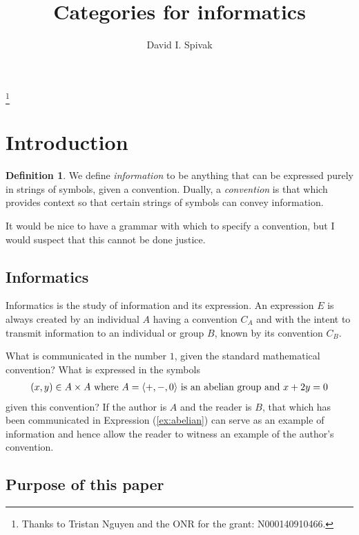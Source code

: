 \documentclass{amsart}
\def\tn{\textnormal}
\def\cross{\times}
\def\la{\langle}
\def\ra{\rangle}
\theoremstyle{remark}
\theoremstyle{definition}
\newtheorem{definition}[theorem]{Definition}
\begin{document}
\title{Categories for informatics}

\author{David I. Spivak}

\thanks{Thanks to Tristan Nguyen and the ONR for the grant: N000140910466.}

\maketitle

\tableofcontents

\section{Introduction}

\begin{definition} We define {\em information} to be anything that can be expressed purely in strings of symbols, given a convention.  Dually, a {\em convention} is that which provides context so that certain strings of symbols can convey information.  

\end{definition}

It would be nice to have a grammar with which to specify a convention, but I would suspect that this cannot be done justice.

\subsection{Informatics}

Informatics is the study of information and its expression.  An expression $E$ is always created by an individual $A$ having a convention $C_A$ and with the intent to transmit information to an individual or group $B$, known by its convention $C_B$.

What is communicated in the number $1$, given the standard mathematical convention?  What is expressed in the symbols \begin{align}\label{ex:abelian}(x,y)\in A\cross A \tn{ where } A=\la+,-,0\ra\tn{ is an abelian group and } x+2y=0\end{align} given this convention?  If the author is $A$ and the reader is $B$, that which has been communicated in  Expression (\ref{ex:abelian}) can serve as an example of information and hence allow the reader to witness an example of the author's convention.

\subsection{Purpose of this paper}
\end{document}
